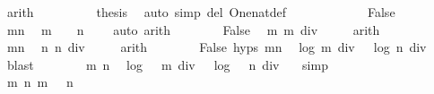 \begin{isabellebody}
\ arith\isanewline
\ \ \ \ \ \ \isamarkupfalse%
\ \isamarkupfalse%
\ {\isacharquery}thesis\ \isamarkupfalse%
\ {\isacharparenleft}auto\ simp\ del{\isacharcolon}\ One{\isacharunderscore}nat{\isacharunderscore}def{\isacharparenright}\isanewline
\ \ \ \ \isamarkupfalse%
\isanewline
\ \ \ \ \ \ \isamarkupfalse%
\ False\isanewline
\ \ \ \ \ \ \isamarkupfalse%
\ mn{}\ \isamarkupfalse%
\ {\isachardoublequoteopen}m\ {\isasymge}\ {}{\isachardoublequoteclose}\ \ {\isachardoublequoteopen}n\ {\isasymge}\ {}{\isachardoublequoteclose}\ \isamarkupfalse%
\ auto\ arith\isanewline
\ \ \ \ \ \ \isamarkupfalse%
\ False\ \isamarkupfalse%
\ m{}{\isacharunderscore}{}{\isacharcolon}\ {\isachardoublequoteopen}m\ div\ {}\ {\isasymnoteq}\ {}{\isachardoublequoteclose}\ \isamarkupfalse%
\ arith\isanewline
\ \ \ \ \ \ \isamarkupfalse%
\ mn{}\ \isamarkupfalse%
\ n{}{\isacharunderscore}{}{\isacharcolon}\ {\isachardoublequoteopen}n\ div\ {}\ {\isasymnoteq}\ {}{\isachardoublequoteclose}\ \isamarkupfalse%
\ arith\isanewline
\ \ \ \ \ \ \isamarkupfalse%
\ False\ {\isachardoublequoteopen}{}{\isachardot}hyps{\isachardoublequoteclose}\ mn{}\ \isamarkupfalse%
\ {\isachardoublequoteopen}log\ {\isacharparenleft}m\ div\ {}{\isacharparenright}\ {\isasymle}\ log\ {\isacharparenleft}n\ div\ {}{\isacharparenright}{\isachardoublequoteclose}\ \isamarkupfalse%
\ blast\isanewline
\ \ \ \ \ \ \isamarkupfalse%
\ m{}{\isacharunderscore}{}\ n{}{\isacharunderscore}{}\ \isamarkupfalse%
\ {\isachardoublequoteopen}log\ {\isacharparenleft}{}\ {\isacharasterisk}\ {\isacharparenleft}m\ div\ {}{\isacharparenright}{\isacharparenright}\ {\isasymle}\ log\ {\isacharparenleft}{}\ {\isacharasterisk}\ {\isacharparenleft}n\ div\ {}{\isacharparenright}{\isacharparenright}{\isachardoublequoteclose}\ \isamarkupfalse%
\ simp\isanewline
\ \ \ \ \ \ \isamarkupfalse%
\ m{}{\isacharunderscore}{}\ n{}{\isacharunderscore}{}\ {\isacharbackquoteopen}m\ {\isasymge}\ {}{\isacharbackquoteclose}\ {\isacharbackquoteopen}n\ {\isasymge}\ {}{\isacharbackquoteclose}\ \isamarkupfalse%

\end{isabellebody}
